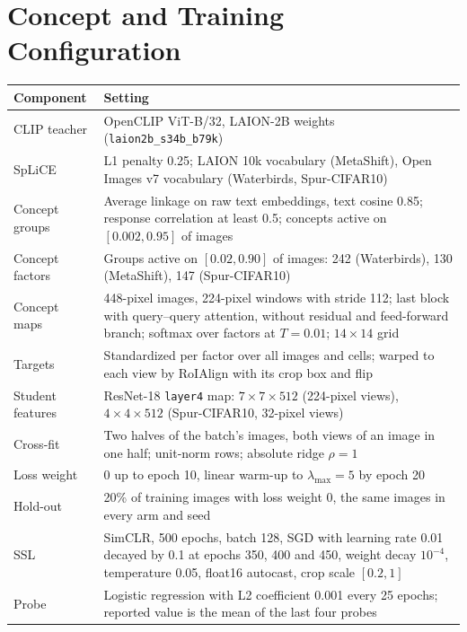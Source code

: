 \documentclass{article}
\begin{document}
\clearpage
\appendix
\section{Concept and Training Configuration}
\label{app:provenance}
\begin{table}[ht]
\centering
\begin{tabularx}{\linewidth}{lX}
\toprule
Component & Setting \\
\midrule
CLIP teacher & OpenCLIP ViT-B/32, LAION-2B weights (\texttt{laion2b\_s34b\_b79k}) \\
SpLiCE & L1 penalty 0.25; LAION 10k vocabulary (MetaShift), Open Images v7 vocabulary (Waterbirds, Spur-CIFAR10) \\
Concept groups & Average linkage on raw text embeddings, text cosine 0.85; response correlation at least 0.5; concepts active on $[0.002,0.95]$ of images \\
Concept factors & Groups active on $[0.02,0.90]$ of images: 242 (Waterbirds), 130 (MetaShift), 147 (Spur-CIFAR10) \\
Concept maps & 448-pixel images, 224-pixel windows with stride 112; last block with query--query attention, without residual and feed-forward branch; softmax over factors at $T=0.01$; $14\times14$ grid \\
Targets & Standardized per factor over all images and cells; warped to each view by RoIAlign with its crop box and flip \\
Student features & ResNet-18 \texttt{layer4} map: $7\times7\times512$ (224-pixel views), $4\times4\times512$ (Spur-CIFAR10, 32-pixel views) \\
Cross-fit & Two halves of the batch's images, both views of an image in one half; unit-norm rows; absolute ridge $\rho=1$ \\
Loss weight & 0 up to epoch 10, linear warm-up to $\lambda_{\max}=5$ by epoch 20 \\
Hold-out & 20\% of training images with loss weight 0, the same images in every arm and seed \\
SSL & SimCLR, 500 epochs, batch 128, SGD with learning rate 0.01 decayed by 0.1 at epochs 350, 400 and 450, weight decay $10^{-4}$, temperature 0.05, float16 autocast, crop scale $[0.2,1]$ \\
Probe & Logistic regression with L2 coefficient 0.001 every 25 epochs; reported value is the mean of the last four probes \\
\bottomrule
\end{tabularx}
\end{table}
\end{document}
